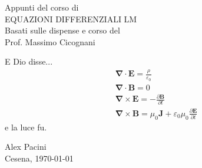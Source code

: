 \begin{titlepage}
\begin{center}
\vfill
%
{\LARGE{\sc Appunti del corso di}}\\
\vspace{10mm} 
{\Huge {EQUAZIONI DIFFERENZIALI LM}} \\
\vspace{15mm}
{\LARGE{Basati sulle dispense e corso del}}\\
{\LARGE{Prof. Massimo Cicognani}}\\
\end{center}
%
\vspace{25mm}
\LARGE {E Dio disse...}
%
\begin{align*}
& \boldsymbol{\nabla} \cdot \boldsymbol{E} = \frac{\rho}{\varepsilon_0} \\
& \boldsymbol{\nabla} \cdot \boldsymbol{B} = 0 \\
& \boldsymbol{\nabla} \times \boldsymbol{E} = - \frac{\partial \boldsymbol{B}}{\partial t} \\
& \boldsymbol{\nabla} \times \boldsymbol{B} = \mu_0 \boldsymbol{J} + \varepsilon_0 \mu_0 \frac{\partial \boldsymbol{E}}{\partial t}
\end{align*}
%
\LARGE e la luce fu.
%
\vfill
\begin{center}
{\Large {Alex Pacini}}\\
\vspace{5mm}
{\large Cesena, \today}
\end{center}


\end{titlepage}
